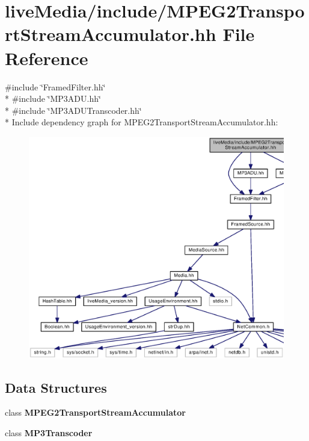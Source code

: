 \section{live\+Media/include/\+M\+P\+E\+G2\+Transport\+Stream\+Accumulator.hh File Reference}
\label{MPEG2TransportStreamAccumulator_8hh}
{\ttfamily \#include \char`\"{}Framed\+Filter.\+hh\char`\"{}}\\*
{\ttfamily \#include \char`\"{}M\+P3\+A\+D\+U.\+hh\char`\"{}}\\*
{\ttfamily \#include \char`\"{}M\+P3\+A\+D\+U\+Transcoder.\+hh\char`\"{}}\\*
Include dependency graph for M\+P\+E\+G2\+Transport\+Stream\+Accumulator.\+hh\+:
\nopagebreak
\begin{figure}[H]
\begin{center}
\leavevmode
\includegraphics[width=350pt]{MPEG2TransportStreamAccumulator_8hh__incl}
\end{center}
\end{figure}
\subsection*{Data Structures}
\begin{DoxyCompactItemize}
\item 
class {\bf M\+P\+E\+G2\+Transport\+Stream\+Accumulator}
\item 
class {\bf M\+P3\+Transcoder}
\end{DoxyCompactItemize}
